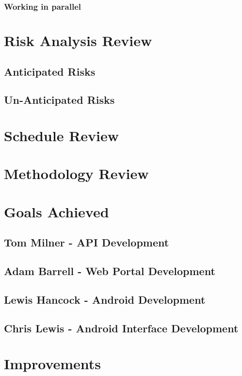 \documentclass[11pt,a4paper]{report}
\begin{document}
\subsubsection{Working in parallel}

\section{Risk Analysis Review}
\label{sec:risk-analysis-review}
\subsection{Anticipated Risks}
\label{sec:anticipated-risks}
\subsection{Un-Anticipated Risks}
\label{sec:unanticipated-risks}
\section{Schedule Review}
\label{sec:schedule-review}
\section{Methodology Review}
\label{sec:methodology-review}
\section{Goals Achieved}
\label{sec:goals-achieved}

\subsection{Tom Milner - API Development}
\subsection{Adam Barrell - Web Portal Development}
\subsection{Lewis Hancock - Android Development}
\subsection{Chris Lewis - Android Interface Development}

\section{Improvements}
\label{sec:improvements}
\end{document}
